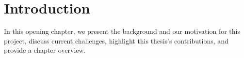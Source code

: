\chapter{Introduction}
\label{chap:introduction}

In this opening chapter, we present the background and our motivation for this project, discuss current challenges, highlight this thesis's contributions, and provide a chapter overview.


%


